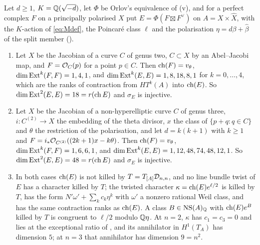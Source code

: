\begin{theorem}[Twisted certificates at $n=2$ and $n=3$]
\label{thm:twistedcert}
Let $d\ge1$, $K=\mathbb{Q}(\sqrt{-d})$, let $\Phi$ be Orlov's equivalence of
(v), and for a perfect complex $F$ on a principally
polarised $X$ put $E=\Phi(F\boxtimes F^{\vee})$ on $A=X\times\widehat{X}$,
with the $K$-action of \eqref{eq:Mdef}, the Poincar\'e class $\ell$ and the
polarisation $\eta=d\beta+\widehat\beta$ of the split member
().
\begin{enumerate}[label=\textup{(\roman*)},leftmargin=2.6em,itemsep=2pt]
\item Let $X$ be the Jacobian of a curve $C$ of genus two, $C\subset X$ by an
  Abel--Jacobi map, and $F=\mathcal{O}_{C}(p)$ for a point $p\in C$. Then
  $\operatorname{ch}(F)=v_{\theta}$, $\dim\operatorname{Ext}^{k}(F,F)=1,4,1$, and
  $\dim\operatorname{Ext}^{k}(E,E)=1,8,18,8,1$ for $k=0,\dots,4$, which are the ranks of
  contraction from $HT^{k}(A)$ into $\operatorname{ch}(E)$. So
  $\dim\operatorname{Ext}^{2}(E,E)=18=r(\operatorname{ch} E)$ and $\sigma_{E}$ is injective.
\item Let $X$ be the Jacobian of a non-hyperelliptic curve $C$ of genus three,
  $i\colon C^{(2)}\to X$ the embedding of the theta divisor, $x$ the class of
  $\{p+q:q\in C\}$ and $\theta$ the restriction of the polarisation, and let
  $d=k(k+1)$ with $k\ge1$ and $F=i_{*}\mathcal{O}_{C^{(2)}}((2k+1)x-k\theta)$. Then
  $\operatorname{ch}(F)=v_{\theta}$, $\dim\operatorname{Ext}^{k}(F,F)=1,6,6,1$, and
  $\dim\operatorname{Ext}^{k}(E,E)=1,12,48,74,48,12,1$. So $\dim\operatorname{Ext}^{2}(E,E)=48=r(\operatorname{ch} E)$
  and $\sigma_{E}$ is injective.
\item In both cases $\operatorname{ch}(E)$ is not killed by $T=T_{[A]}\mathcal{D}_{n,n}$, and no
  line bundle twist of $E$ has a character killed by $T$; the twisted
  character $\kappa=\operatorname{ch}(E)e^{\ell/2}$ is killed by $T$, has the form
  $N'\omega'+\sum_{k}c_{k}\eta^{k}$ with $\omega'$ a nonzero rational Weil
  class, and has the same contraction ranks as $\operatorname{ch}(E)$. A class
  $B\in\mathrm{NS}(A)_{\mathbb{Q}}$ with $\operatorname{ch}(E)e^{B}$ killed by $T$ is congruent to $\ell/2$
  modulo $\mathbb{Q}\eta$. At $n=2$,
  $\kappa$ has $c_{1}=c_{3}=0$ and lies at the exceptional ratio of
  , and its annihilator in $H^{1}(T_{A})$ has
  dimension $5$; at $n=3$ that annihilator has dimension $9=n^{2}$.
\end{enumerate}
\end{theorem}

